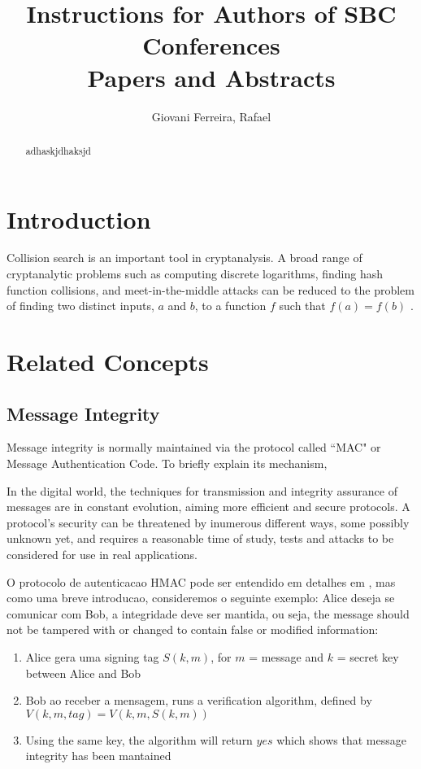 \documentclass[12pt]{article}
\title{Instructions for Authors of SBC Conferences\\ Papers and Abstracts}
\author{Giovani Ferreira\inst{1}, Rafael\inst{1} }
\begin{document}
\maketitle

\begin{abstract}
adhaskjdhaksjd \cite{tanenbaum2002distributed}
\end{abstract}

\section{Introduction}

Collision search is an important tool in cryptanalysis. A broad range of cryptanalytic problems
such as computing discrete logarithms, finding hash function collisions, and meet-in-the-middle
attacks can be reduced to the problem of finding two distinct inputs, \(a\) and \(b\), to a 
function \(f\) such that \(f(a) = f(b)\) \cite{van1999parallel}.

\section{Related Concepts} 

\subsection{Message Integrity}

Message integrity is normally maintained via the protocol called “MAC" or Message Authentication Code. 
To briefly explain its mechanism,

In the digital world, the techniques for transmission and integrity assurance of messages are in constant
evolution, aiming more efficient and secure protocols. A protocol's security can be threatened by inumerous
different ways, some possibly unknown yet, and requires a reasonable time of study, tests and attacks
to be considered for use in real applications.

O protocolo de autenticacao HMAC pode ser entendido em detalhes em \cite{krawczyk1997hmac}, mas como uma breve
introducao, consideremos o seguinte exemplo: Alice deseja se comunicar com Bob, a integridade deve ser
mantida, ou seja, the message should not be tampered with or changed to contain false or modified information:
\begin{enumerate}
\item Alice gera uma signing tag \(S(k, m)\), for \(m\) = message and \(k\) = secret key between Alice and Bob
\item Bob ao receber a mensagem, runs a verification algorithm, defined by \(V(k, m, tag) = V(k, m, S(k, m))\)
\item Using the same key, the algorithm will return \(yes\) which shows that message integrity has been mantained
\end{enumerate}
\end{document}
